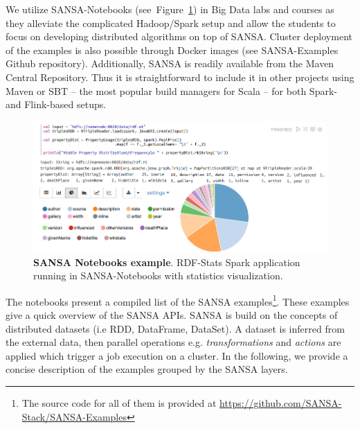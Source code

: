 We utilize SANSA-Notebooks (see~Figure~\ref{fig:notebooks}) in Big Data labs and courses as they alleviate the complicated Hadoop/Spark setup and allow the students to focus on developing distributed algorithms on top of SANSA. 
Cluster deployment of the examples is also possible through Docker images (see SANSA-Examples Github repository). 
Additionally, SANSA is readily available from the Maven Central Repository. 
Thus it is straightforward to include it in other projects using Maven or SBT -- the most popular build managers for Scala -- for both Spark- and Flink-based setups. 

\begin{figure}
    \centering
    \includegraphics[width=.9\textwidth]{images/7_implemenation_and_usecases/RDF-Statistics_withoutlangTAG-cropped.png}
    \caption{\textbf{SANSA Notebooks example}.
    RDF-Stats Spark application running in SANSA-Notebooks with statistics visualization.}
    \label{fig:notebooks}
\end{figure}

The notebooks present a compiled list of the SANSA examples\footnote{\scriptsize{The source code for all of them is provided at \url{https://github.com/SANSA-Stack/SANSA-Examples}}}.
These examples give a quick overview of the SANSA \gls{API}s.
SANSA is build on the concepts of distributed datasets (i.e \gls{RDD}, DataFrame, DataSet). 
A dataset is inferred from the external data, then parallel operations e.g. \textit{transformations} and \textit{actions} are applied which trigger a job execution on a cluster.
In the following, we provide a concise description of the examples grouped by the SANSA layers.

